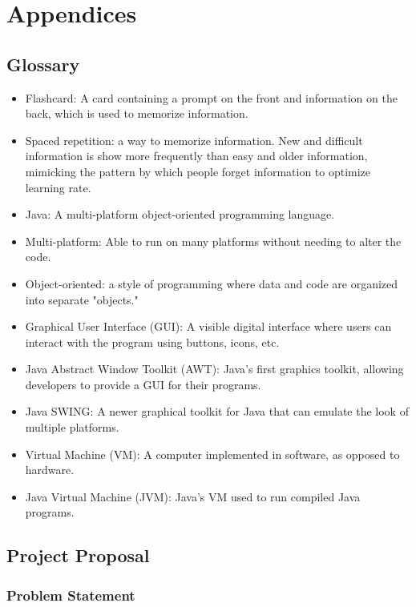 \documentclass{scrreprt}
\begin{document}
\chapter{Appendices}

\section{Glossary}
\begin{itemize}
    \item Flashcard: A card containing a prompt on the front and information on the back,
        which is used to memorize information.
    \item Spaced repetition: a way to memorize information. New and difficult information
        is show more frequently than easy and older information, mimicking the pattern
        by which people forget information to optimize learning rate.
    \item Java: A multi-platform object-oriented programming language.
    \item Multi-platform: Able to run on many platforms without needing to alter the code.
    \item Object-oriented: a style of programming where data and code are organized into
        separate "objects."
    \item Graphical User Interface (GUI): A visible digital interface where users can 
        interact with the program using buttons, icons, etc.
    \item Java Abstract Window Toolkit (AWT): Java's first graphics toolkit, allowing developers
        to provide a GUI for their programs.
    \item Java SWING: A newer graphical toolkit for Java that can emulate the look of multiple platforms.
    \item Virtual Machine (VM): A computer implemented in software, as opposed to hardware.
    \item Java Virtual Machine (JVM): Java's VM used to run compiled Java programs.
\end{itemize}


\section{Project Proposal}

\subsection{Problem Statement}
\end{document}
